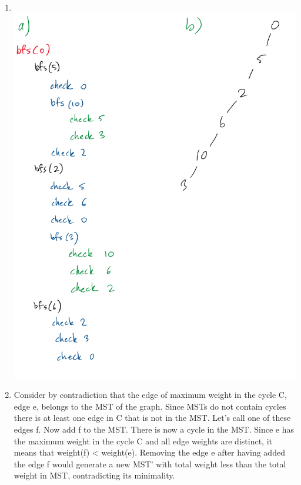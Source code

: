 \documentclass[11pt,fleqn]{article}
\begin{document}
\begin{enumerate}
	\item $~$\\
\includegraphics[scale=0.75]{Q3}

	\item Consider by contradiction that the edge of maximum weight in the cycle C, edge e, belongs to the MST of the graph.
Since MSTs do not contain cycles there is at least one edge in C that is not in the MST. Let's call one of these edges f.
Now add f to the MST. There is now a cycle in the MST. Since e has the maximum weight in the cycle C and all edge weights are distinct, it means that weight(f) < weight(e). 
Removing the edge e after having added the edge f would generate a new MST' with total weight less than the total weight in MST, contradicting its minimality.

\newpage


\end{enumerate}
\end{document}
